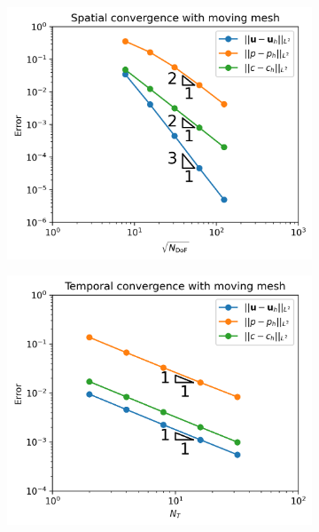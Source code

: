            \begin{figure}
                \centering
                \begin{subfigure}{0.45\textwidth}
                    \centering
                    \includegraphics[width=\textwidth]{diagrams/results-convergence/mm_spatial_convergence.png}
                    \caption{}
                    \label{fig:mms-mm-convergence:space}
                \end{subfigure}
                \hfill
                \begin{subfigure}{0.45\textwidth}
                    \centering
                    \includegraphics[width=\textwidth]{diagrams/results-convergence/mm_temporal_convergence.png}

\end{subfigure}
\end{figure}
